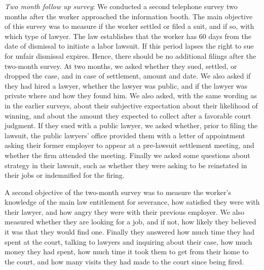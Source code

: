 \documentclass[12 pt]{article}
\begin{document}
\emph{Two month follow up survey}: We conducted a second telephone survey two months after the worker approached the information booth. The main objective of this survey was to measure if the worker settled or filed a suit, and if so, with which type of lawyer. The law establishes that the worker has 60 days from the date of dismissal to initiate a labor lawsuit. If this period lapses the right to sue for unfair dismissal expires. Hence, there should be no additional filings after the two-month survey. At two months, we asked whether they sued, settled, or dropped the case, and in case of settlement, amount and date. We also asked if they had hired a lawyer, whether the lawyer was public, and if the lawyer was private where and how they found him. We also asked, with the same wording as in the earlier surveys, about their subjective expectation about their likelihood of winning, and about the amount they expected to collect after a favorable court judgment. If they sued with a public lawyer, we asked whether, prior to filing the lawsuit, the public lawyers’ office provided them with a letter of appointment asking their former employer to appear at a pre-lawsuit settlement meeting, and whether the firm attended the meeting. Finally we asked some questions about strategy in their lawsuit, such as whether they were asking to be reinstated in their jobs or indemnified for the firing.

A second objective of the two-month survey was to measure the worker’s knowledge of the main law entitlement for severance, how satisfied they were with their lawyer, and how angry they were with their previous employer. We also measured whether they are looking for a job, and if not, how likely they believed it was that they would find one. Finally they answered how much time they had spent at the court, talking to lawyers and inquiring about their case, how much money they had spent, how much time it took them to get from their home to the court, and how many visits they had made to the court since being fired.
\end{document}
